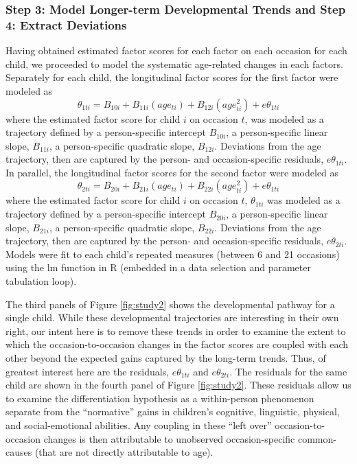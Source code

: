\documentclass[man]{apa7}
\begin{document}
\hypertarget{step-3-model-longer-term-developmental-trends-and-step-4-extract-deviations}{%
\subsubsection*{Step 3: Model Longer-term Developmental Trends and Step
4: Extract
Deviations}\label{step-3-model-longer-term-developmental-trends-and-step-4-extract-deviations}}

Having obtained estimated factor scores for each factor on each occasion
for each child, we proceeded to model the systematic age-related changes
in each factors. Separately for each child, the longitudinal factor
scores for the first factor were modeled as \begin{equation}
\theta_{1ti} = B_{10i} + B_{11i}(age_{ti}) + B_{12i}(age^2_{ti}) + e\theta_{1ti}
\end{equation} where the estimated factor score for child \(i\) on
occasion \(t\), was modeled as a trajectory defined by a person-specific
intercept \(B_{10i}\), a person-specific linear slope, \(B_{11i}\), a
person-specific quadratic slope, \(B_{12i}\). Deviations from the age
trajectory, then are captured by the person- and occasion-specific
residuals, \(e\theta_{1ti}\). In parallel, the longitudinal factor
scores for the second factor were modeled as \begin{equation}
\theta_{2ti} = B_{20i} + B_{21i}(age_{ti}) + B_{22i}(age^2_{ti}) + e\theta_{1ti}
\end{equation} where the estimated factor score for child \(i\) on
occasion \(t\), \(\theta_{1ti}\) was modeled as a trajectory defined by
a person-specific intercept \(B_{20i}\), a person-specific linear slope,
\(B_{21i}\), a person-specific quadratic slope, \(B_{22i}\). Deviations
from the age trajectory, then are captured by the person- and
occasion-specific residuals, \(e\theta_{2ti}\). Models were fit to each
child's repeated measures (between 6 and 21 occasions) using the lm
function in R (embedded in a data selection and parameter tabulation
loop).

The third panels of Figure \ref{fig:study2} shows the developmental
pathway for a single child. While these developmental trajectories are
interesting in their own right, our intent here is to remove these
trends in order to examine the extent to which the occasion-to-occasion
changes in the factor scores are coupled with each other beyond the
expected gains captured by the long-term trends. Thus, of greatest
interest here are the residuals, \(e\theta_{1ti}\) and
\(e\theta_{2ti}\). The residuals for the same child are shown in the
fourth panel of Figure \ref{fig:study2}. These residuals allow us to
examine the differentiation hypothesis as a within-person phenomenon
separate from the ``normative'' gains in children's cognitive,
linguistic, physical, and social-emotional abilities. Any coupling in
these ``left over'' occasion-to-occasion changes is then attributable to
unobserved occasion-specific common-causes (that are not directly
attributable to age).
\end{document}
